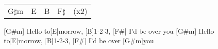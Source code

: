 \begin{guitar}
	 
	
	{\footnotesize\begin{tabular}{l|l|l|l l}
			G$\sharp$m & E & B & F$\sharp$ & (x2)
	\end{tabular}}

	 
	
	 
	
	[G#m] Hello to[E]morrow, [B]1-2-3, [F#] I'd be over you
	[G#m] Hello to[E]morrow, [B]1-2-3, [F#] I'd be over [G#m]you
\end{guitar}
